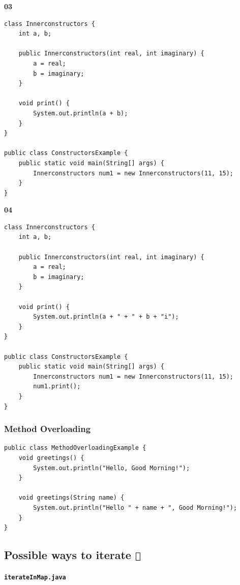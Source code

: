 \documentclass{book}
\begin{document}
\textbf{03}
\begin{verbatim}
class Innerconstructors {
    int a, b;

    public Innerconstructors(int real, int imaginary) {
        a = real;
        b = imaginary;
    }

    void print() {
        System.out.println(a + b);
    }
}

public class ConstructorsExample {
    public static void main(String[] args) {
        Innerconstructors num1 = new Innerconstructors(11, 15);
    }
}
\end{verbatim}

\textbf{04}
\begin{verbatim}
class Innerconstructors {
    int a, b;

    public Innerconstructors(int real, int imaginary) {
        a = real;
        b = imaginary;
    }

    void print() {
        System.out.println(a + " + " + b + "i");
    }
}

public class ConstructorsExample {
    public static void main(String[] args) {
        Innerconstructors num1 = new Innerconstructors(11, 15);
        num1.print();
    }
}
\end{verbatim}

\subsubsection{Method Overloading}

\begin{verbatim}
public class MethodOverloadingExample {
    void greetings() {
        System.out.println("Hello, Good Morning!");
    }

    void greetings(String name) {
        System.out.println("Hello " + name + ", Good Morning!");
    }
}
\end{verbatim}



\subsection{Possible ways to iterate \texttt{🏃}}

\textbf{\texttt{iterateInMap.java}}
\end{document}
